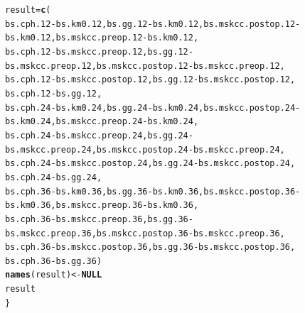 \documentclass{article}\usepackage[]{graphicx}\usepackage[]{color}
\makeatletter
\newcommand{\hlopt}[1]{\textcolor[rgb]{0,0,0}{#1}}%
\newcommand{\hlstd}[1]{\textcolor[rgb]{0.345,0.345,0.345}{#1}}%
\newcommand{\hlkwa}[1]{\textcolor[rgb]{0.161,0.373,0.58}{\textbf{#1}}}%
\newcommand{\hlkwb}[1]{\textcolor[rgb]{0.69,0.353,0.396}{#1}}%
\newcommand{\hlkwd}[1]{\textcolor[rgb]{0.737,0.353,0.396}{\textbf{#1}}}%
\newenvironment{kframe}{%
 \def\at@end@of@kframe{}%
 \ifinner\ifhmode%
  \def\at@end@of@kframe{\end{minipage}}%
  \begin{minipage}{\columnwidth}%
 \fi\fi%
 \def\FrameCommand##1{\hskip\@totalleftmargin \hskip-\fboxsep
 \colorbox{shadecolor}{##1}\hskip-\fboxsep
     \hskip-\linewidth \hskip-\@totalleftmargin \hskip\columnwidth}%
 \MakeFramed {\advance\hsize-\width
   \@totalleftmargin\z@ \linewidth\hsize
   \@setminipage}}%
 {\par\unskip\endMakeFramed%
 \at@end@of@kframe}
\newenvironment{knitrout}{}{} %
\makeatother
\begin{document}
\begin{knitrout}
\begin{kframe}
\begin{alltt}
        \hlstd{result} \hlkwb{=} \hlkwd{c}\hlstd{(}
                \hlstd{bs.cph.12} \hlopt{-} \hlstd{bs.km0.12,                  bs.gg.12} \hlopt{-} \hlstd{bs.km0.12,                   bs.mskcc.postop.12} \hlopt{-} \hlstd{bs.km0.12,                 bs.mskcc.preop.12} \hlopt{-} \hlstd{bs.km0.12,}
                \hlstd{bs.cph.12} \hlopt{-} \hlstd{bs.mskcc.preop.12,  bs.gg.12} \hlopt{-} \hlstd{bs.mskcc.preop.12,   bs.mskcc.postop.12} \hlopt{-} \hlstd{bs.mskcc.preop.12,}
                \hlstd{bs.cph.12} \hlopt{-} \hlstd{bs.mskcc.postop.12, bs.gg.12} \hlopt{-} \hlstd{bs.mskcc.postop.12,}
                \hlstd{bs.cph.12} \hlopt{-} \hlstd{bs.gg.12,}
                \hlstd{bs.cph.24} \hlopt{-} \hlstd{bs.km0.24,                  bs.gg.24} \hlopt{-} \hlstd{bs.km0.24,                   bs.mskcc.postop.24} \hlopt{-} \hlstd{bs.km0.24,                 bs.mskcc.preop.24} \hlopt{-} \hlstd{bs.km0.24,}
                \hlstd{bs.cph.24} \hlopt{-} \hlstd{bs.mskcc.preop.24,  bs.gg.24} \hlopt{-} \hlstd{bs.mskcc.preop.24,   bs.mskcc.postop.24} \hlopt{-} \hlstd{bs.mskcc.preop.24,}
                \hlstd{bs.cph.24} \hlopt{-} \hlstd{bs.mskcc.postop.24, bs.gg.24} \hlopt{-} \hlstd{bs.mskcc.postop.24,}
                \hlstd{bs.cph.24} \hlopt{-} \hlstd{bs.gg.24,}
                \hlstd{bs.cph.36} \hlopt{-} \hlstd{bs.km0.36,                  bs.gg.36} \hlopt{-} \hlstd{bs.km0.36,                   bs.mskcc.postop.36} \hlopt{-} \hlstd{bs.km0.36,                 bs.mskcc.preop.36} \hlopt{-} \hlstd{bs.km0.36,}
                \hlstd{bs.cph.36} \hlopt{-} \hlstd{bs.mskcc.preop.36,  bs.gg.36} \hlopt{-} \hlstd{bs.mskcc.preop.36,   bs.mskcc.postop.36} \hlopt{-} \hlstd{bs.mskcc.preop.36,}
                \hlstd{bs.cph.36} \hlopt{-} \hlstd{bs.mskcc.postop.36, bs.gg.36} \hlopt{-} \hlstd{bs.mskcc.postop.36,}
                \hlstd{bs.cph.36} \hlopt{-} \hlstd{bs.gg.36)}
        \hlkwd{names}\hlstd{(result)} \hlkwb{<-} \hlkwa{NULL}
        \hlstd{result}
\hlstd{\}}


\end{alltt}
\end{kframe}
\end{knitrout}
\end{document}
